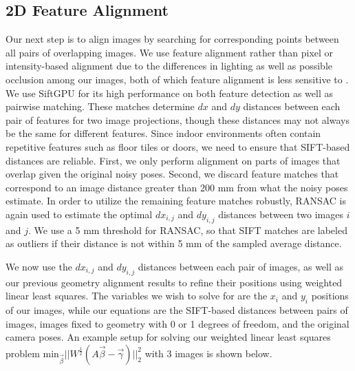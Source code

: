 \documentclass[]{spie}  %
\begin{document}
\subsection{2D Feature Alignment}
\label{sec:robustSIFTFeatureMatching}
Our next step is to align images by searching for corresponding points
between all pairs of overlapping images. We use feature alignment
rather than pixel or intensity-based alignment due to the differences
in lighting as well as possible occlusion among our images, both of
which feature alignment is less sensitive to \cite{lowe1999object,
  mikolajczyk2005performance, szeliski2006image}.  We use SiftGPU
\cite{siftgpu} for its high performance on both feature detection as
well as pairwise matching. These matches determine $dx$ and $dy$
distances between each pair of features for two image projections,
though these distances may not always be the same for different
features. Since indoor environments often contain repetitive features
such as floor tiles or doors, we need to ensure that SIFT-based
distances are reliable. First, we only perform alignment on parts of
images that overlap given the original noisy poses. Second, we discard
feature matches that correspond to an image distance greater than 200
mm from what the noisy poses estimate. In order to utilize the
remaining feature matches robustly, RANSAC \cite{fischler1981random}
is again used to estimate the optimal $dx_{i,j}$ and $dy_{i,j}$
distances between two images $i$ and $j$. We use a 5 mm threshold for
RANSAC, so that SIFT matches are labeled as outliers if their distance
is not within 5 mm of the sampled average distance.


We now use the $dx_{i,j}$ and $dy_{i,j}$ distances between each pair
of images, as well as our previous geometry alignment results to refine their positions using weighted linear least
squares. The variables we wish to solve for are the $x_i$ and $y_i$
positions of our images, while our equations are the SIFT-based
distances between pairs of images, images fixed to geometry with 0 or
1 degrees of freedom, and the original camera poses. An example setup for
solving our weighted linear least squares problem $\textrm{min}_{\vec{\beta}} ||W^\frac{1}{2}(A \vec{\beta} -
\vec{\gamma})||_2^2 $ with 3 images is shown below.
\end{document}
